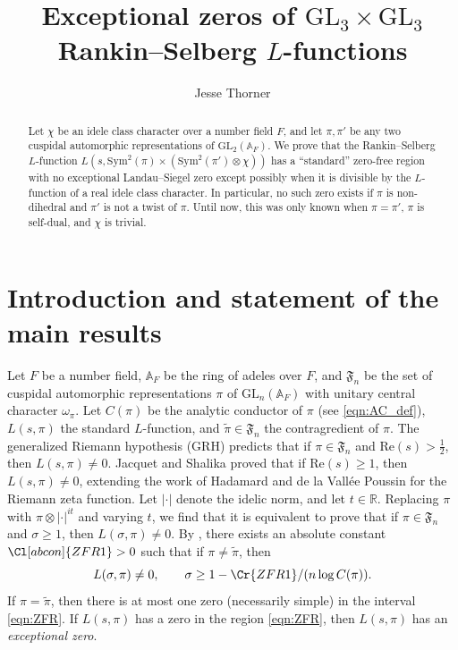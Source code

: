 \documentclass[11pt]{amsart}
\title[Exceptional zeros of $\mathrm{GL}_3\times\mathrm{GL}_3$ Rankin--Selberg $L$-functions]{Exceptional zeros of $\mathrm{GL}_3\times\mathrm{GL}_3$ Rankin--Selberg $L$-functions}
\author{Jesse Thorner}
\theoremstyle{remark}
\numberwithin{equation}{section}
\begin{document}
\begin{abstract}
Let $\chi$ be an idele class character over a number field $F$, and let $\pi,\pi'$ be any two cuspidal automorphic representations of $\mathrm{GL}_2(\mathbb{A}_F)$.  We prove that the Rankin--Selberg $L$-function $L(s,\mathrm{Sym}^2(\pi)\times(\mathrm{Sym}^2 (\pi')\otimes\chi))$ has a ``standard'' zero-free region with no exceptional Landau--Siegel zero except possibly when it is divisible by the $L$-function of a real idele class character.  In particular, no such zero exists if $\pi$ is non-dihedral and $\pi'$ is not a twist of $\pi$.  Until now, this was only known when $\pi=\pi'$, $\pi$ is self-dual, and $\chi$ is trivial.
\end{abstract}

\maketitle

\section{Introduction and statement of the main results}
\label{sec:intro}

Let $F$ be a number field, $\mathbb{A}_F$ be the ring of adeles over $F$, and $\mathfrak{F}_{n}$ be the set of cuspidal automorphic representations $\pi$ of $\mathrm{GL}_{n}(\mathbb{A}_F)$ with unitary central character $\omega_{\pi}$.  Let $C(\pi)$ be the analytic conductor of $\pi$ (see \eqref{eqn:AC_def}), $L(s,\pi)$ the standard $L$-function, and $\widetilde{\pi}\in\mathfrak{F}_{n}$ the contragredient of $\pi$.  The generalized Riemann hypothesis (GRH) predicts that if $\pi\in\mathfrak{F}_{n}$ and $\mathrm{Re}(s)>\frac{1}{2}$, then $L(s,\pi)\neq 0$.  Jacquet and Shalika \cite{JS} proved that if $\mathrm{Re}(s)\geq 1$, then $L(s,\pi)\neq 0$, extending the work of Hadamard and de la Vall{\'e}e Poussin for the Riemann zeta function.  Let $|\cdot|$ denote the idelic norm, and let $t\in\mathbb{R}$.  Replacing $\pi$ with $\pi\otimes|\cdot|^{it}$ and varying $t$, we find that it is equivalent to prove that if $\pi\in\mathfrak{F}_{n}$ and $\sigma\geq 1$, then $L(\sigma,\pi)\neq 0$.  By \cite[Theorem 1.1]{Wattanawanichkul},  there exists an absolute constant $\Cl[abcon]{ZFR1}>0$ such that if $\pi\neq\widetilde{\pi}$, then
\begin{equation}
\label{eqn:ZFR}
L(\sigma,\pi)\neq 0,\qquad \sigma\geq  1-\Cr{ZFR1}/(n\log C(\pi)).
\end{equation}
If $\pi=\widetilde{\pi}$, then there is at most one zero (necessarily simple) in the interval \eqref{eqn:ZFR}.  If $L(s,\pi)$ has a zero in the region \eqref{eqn:ZFR}, then $L(s,\pi)$ has an {\it exceptional zero}.
\end{document}
